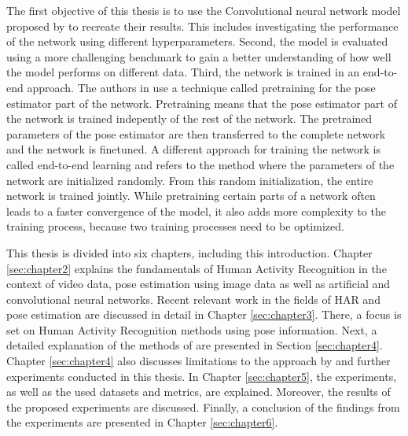 The first objective of this thesis is to use the Convolutional neural network model proposed by \cite{luvizon_2d/3d_2018} to recreate their results.
This includes investigating the performance of the network using different hyperparameters.
Second, the model is evaluated using a more challenging benchmark to gain a better understanding of how well the model performs on different data.
Third, the network is trained in an end-to-end approach.
The authors in \cite{luvizon_2d/3d_2018} use a technique called pretraining for the pose estimator part of the network.
Pretraining means that the pose estimator part of the network is trained indepently of the rest of the network.
The pretrained parameters of the pose estimator are then transferred to the complete network and the network is finetuned.
A different approach for training the network is called end-to-end learning and refers to the method where the parameters of the network are initialized randomly.
From this random initialization, the entire network is trained jointly.
While pretraining certain parts of a network often leads to a faster convergence of the model, it also adds more complexity to the training process, because two training processes need to be optimized.

This thesis is divided into six chapters, including this introduction.
Chapter \ref{sec:chapter2} explains the fundamentals of Human Activity Recognition in the context of video data, pose estimation using image data as well as artificial and convolutional neural networks.
Recent relevant work in the fields of HAR and pose estimation are discussed in detail in Chapter \ref{sec:chapter3}.
There, a focus is set on Human Activity Recognition methods using pose information.
Next, a detailed explanation of the methods of \cite{luvizon_2d/3d_2018} are presented in Section \ref{sec:chapter4}.
Chapter \ref{sec:chapter4} also discusses limitations to the approach by \cite{luvizon_2d/3d_2018} and further experiments conducted in this thesis.
In Chapter \ref{sec:chapter5}, the experiments, as well as the used datasets and metrics, are explained.
Moreover, the results of the proposed experiments are discussed.
Finally, a conclusion of the findings from the experiments are presented in Chapter \ref{sec:chapter6}.
